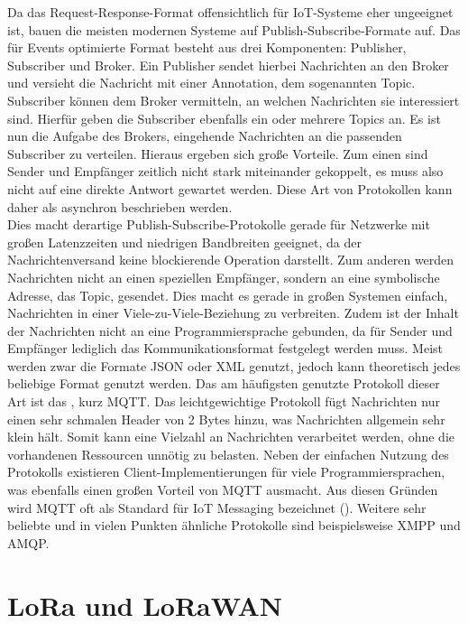 Da das Request-Response-Format offensichtlich für IoT-Systeme eher ungeeignet ist, bauen die meisten modernen Systeme auf Publish-Subscribe-Formate auf. Das für Events optimierte Format besteht aus drei Komponenten: Publisher, Subscriber und Broker. Ein Publisher sendet hierbei Nachrichten an den Broker und versieht die Nachricht mit einer Annotation, dem sogenannten Topic. Subscriber können dem Broker vermitteln, an welchen Nachrichten sie interessiert sind. Hierfür geben die Subscriber ebenfalls ein oder mehrere Topics an. Es ist nun die Aufgabe des Brokers, eingehende Nachrichten an die passenden Subscriber zu verteilen. Hieraus ergeben sich große Vorteile. Zum einen sind Sender und Empfänger zeitlich nicht stark miteinander gekoppelt, es muss also nicht auf eine direkte Antwort gewartet werden. Diese Art von Protokollen kann daher als asynchron beschrieben werden. \\ 
Dies macht derartige Publish-Subscribe-Protokolle gerade für Netzwerke mit großen Latenzzeiten und niedrigen Bandbreiten geeignet, da der Nachrichtenversand keine blockierende Operation darstellt. Zum anderen werden Nachrichten nicht an einen speziellen Empfänger, sondern an eine symbolische Adresse, das Topic, gesendet. Dies macht es gerade in großen Systemen einfach, Nachrichten in einer Viele-zu-Viele-Beziehung zu verbreiten. Zudem ist der Inhalt der Nachrichten nicht an eine Programmiersprache gebunden, da für Sender und Empfänger lediglich das Kommunikationsformat festgelegt werden muss. Meist werden zwar die Formate JSON oder XML genutzt, jedoch kann theoretisch jedes beliebige Format genutzt werden. Das am häufigsten genutzte Protokoll dieser Art ist das , kurz MQTT. Das leichtgewichtige Protokoll fügt Nachrichten nur einen sehr schmalen Header von 2 Bytes hinzu, was Nachrichten allgemein sehr klein hält. Somit kann eine Vielzahl an Nachrichten verarbeitet werden, ohne die vorhandenen Ressourcen unnötig zu belasten. Neben der einfachen Nutzung des Protokolls existieren Client-Implementierungen für viele Programmiersprachen, was ebenfalls einen großen Vorteil von MQTT ausmacht. Aus diesen Gründen wird MQTT oft als Standard für IoT Messaging bezeichnet (\cite{Happ.2020, Rani.2019}). Weitere sehr beliebte und in vielen Punkten ähnliche Protokolle sind beispielsweise XMPP und AMQP.

\section{LoRa und LoRaWAN}
\label{sec:ThHi:loralorawan}

